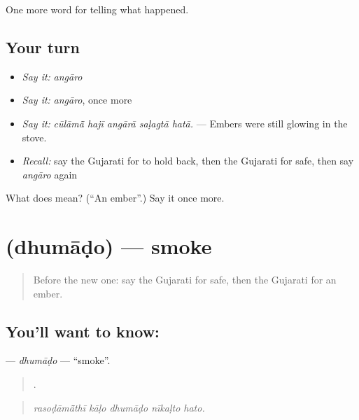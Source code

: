 \begin{grammarlens}[title={What you've built}]
One more word for telling what happened.
\end{grammarlens}

\subsection*{Your turn}
\begin{itemize}
\raggedright
  \item \emph{Say it:} \emph{angāro}
  \item \emph{Say it:} \emph{angāro}, once more
  \item \emph{Say it:} \emph{cūlāmā̃ hajī angārā saḷagtā hatā.} — Embers were still glowing in the stove.
  \item \emph{Recall:} say the Gujarati for to hold back, then the Gujarati for safe, then say \emph{angāro} again
\end{itemize}

\begin{tcolorbox}[breakable,colback=teal!4,colframe=teal!35!black,title={Before you move on}]
What does  mean? (\textquotedblleft{}An ember\textquotedblright{}.) Say it once more.
\end{tcolorbox}
\section[\texorpdfstring{\gu{ધુમાડો} (dhumāḍo)}{ધુમાડો (dhumāḍo)}]{ (dhumāḍo) — smoke}

\label{lesson:GU-C300-dhumado}



\begin{quote}
Before the new one: say the Gujarati for safe, then the Gujarati for an ember.
\end{quote}

\subsection*{You'll want to know: }
\textbf{} — \emph{dhumāḍo} — \textquotedblleft{}smoke\textquotedblright{}.

\begin{quote}
    .
\end{quote}

\begin{quote}
\emph{rasoḍāmā̃thī kāḷo dhumāḍo nīkaḷto hato.}
\end{quote}

